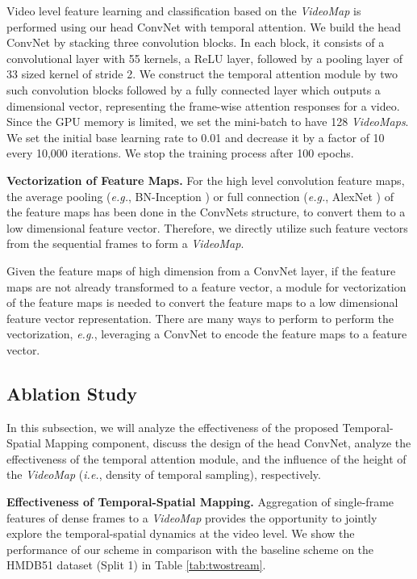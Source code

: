 \documentclass[english, 10pt, twocolumn, twoside]{IEEEtran}
\begin{document}
Video level feature learning and classification based on the \emph{VideoMap} is performed using our head ConvNet with temporal attention. We build the head ConvNet by stacking three convolution blocks. In each block, it consists of a convolutional layer with 55 kernels, a ReLU layer, followed by a pooling layer of 33 sized kernel of stride 2. We construct the temporal attention module by two such convolution blocks followed by a fully connected layer which outputs a  dimensional vector, representing the frame-wise attention responses for a video. Since the GPU memory is limited, we set the mini-batch to have 128 \emph{VideoMaps}. We set the initial base learning rate to 0.01 and decrease it by a factor of 10 every 10,000 iterations. We stop the training process after 100 epochs.



\noindent\textbf{Vectorization of Feature Maps.} For the high level convolution feature maps, the average pooling (\emph{e.g.}, BN-Inception \cite{wang2016temporal}) or full connection (\emph{e.g.}, AlexNet \cite{simonyan2014two}) of the feature maps has been done in the ConvNets structure, to convert them to a low dimensional feature vector. Therefore, we directly utilize such feature vectors from the sequential frames to form a \emph{VideoMap}.

Given the feature maps of high dimension from a ConvNet layer, if the feature maps are not already transformed to a feature vector, a module for vectorization of the feature maps is needed to convert the feature maps to a low dimensional feature vector representation. There are many ways to perform to perform the vectorization, \emph{e.g.}, leveraging a ConvNet to encode the feature maps to a feature vector.









\subsection{Ablation Study}

In this subsection, we will analyze the effectiveness of the proposed Temporal-Spatial Mapping component, discuss the design of the head ConvNet, analyze the effectiveness of the temporal attention module, and the influence of the height of the \emph{VideoMap} (\emph{i.e.}, density of temporal sampling), respectively.


\noindent\textbf{Effectiveness of Temporal-Spatial Mapping.} Aggregation of single-frame features of dense frames to a \emph{VideoMap} provides the opportunity to jointly explore the temporal-spatial dynamics at the video level. We show the performance of our scheme in comparison with the baseline scheme on the HMDB51 dataset (Split 1) in Table \ref{tab:twostream}.
\end{document}
